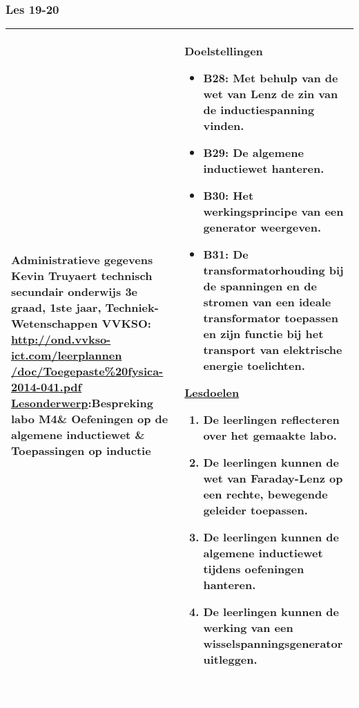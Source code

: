 


\begin{landscape}
	\subsubsection{Les 19-20}
	\begin{tabularx}{1.56\textwidth}{|p{}|X|}\hline
		\textbf{Administratieve gegevens}\newline\newline
		Kevin Truyaert\newline\newline
		technisch secundair onderwijs\newline
		3e graad, 1ste jaar, Techniek-Wetenschappen\newline
		VVKSO: \href{http://ond.vvkso-ict.com/leerplannen/doc/Toegepaste\%20fysica-2014-041.pdf}{http://ond.vvkso-ict.com/leerplannen /doc/Toegepaste\%20fysica-2014-041.pdf} \newline
		\underline{Lesonderwerp}:\newline Bespreking labo M4\& Oefeningen op de algemene inductiewet \& Toepassingen op inductie & \textbf{Doelstellingen}
		\begin{itemize}[itemsep=0.08\baselineskip]
			\item B28: Met behulp van de wet van Lenz de zin van de inductiespanning vinden.
			\item B29: De algemene inductiewet hanteren.
			\item B30: Het werkingsprincipe van een generator weergeven.
			\item B31: De transformatorhouding bij de spanningen en de stromen van een ideale transformator toepassen en zijn functie bij het transport van elektrische energie toelichten.
		\end{itemize}
		\underline{Lesdoelen}\newline
		\vspace{-0.75cm}
		\begin{enumerate}[itemsep=0.08\baselineskip]
			\item De leerlingen reflecteren over het gemaakte labo.
			\item De leerlingen kunnen de wet van Faraday-Lenz op een rechte, bewegende geleider toepassen.
			\item De leerlingen kunnen de algemene inductiewet tijdens oefeningen hanteren.
			\item De leerlingen kunnen de werking van een wisselspanningsgenerator uitleggen.
		\end{enumerate} \\\hline
	\end{tabularx}\vfill \textcolor{white}{.} 



\end{landscape}
